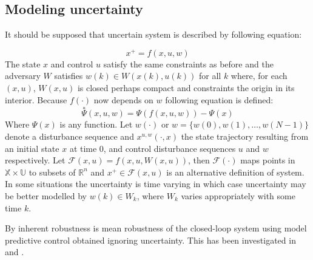 \subsection*{Modeling uncertainty}
\noindent It should be supposed that uncertain system is  described by following equation:

\begin{equation}
    x^+ = f(x,u,w)
\end{equation}
\noindent The state $x$ and control $u$ satisfy the same constraints as before and the adversary $W$ satisfies $w(k)\in W(x(k),u(k))$ for all $k$ where, for each $(x,u)$, $W(x,u)$ is closed perhaps compact and constraints the origin in its interior. Because $f(\cdot)$ now depends on $w$ following equation is defined:
\begin{equation}
    \overset{\ast}{\Psi}(x,u,w)=\Psi(f(x,u,w))-\Psi(x)
\end{equation}
\noindent Where $\Psi(x)$ is any function. Let $w(\cdot)$ or $w=\{w(0), w(1),\dots, w(N-1)\}$ denote a disturbance sequence and $x^{u,w}(\cdot,x)$ the state trajectory resulting from an initial state $x$ at time 0, and control disturbance sequences $u$ and $w$ respectively. Let $\mathscr{F}(x,u)=f(x,u,W(x,u))$, then $\mathscr{F}(\cdot)$ maps points in $\mathbb{X}\times\mathbb{U}$ to subsets of $\mathbb{R}^n$ and $x^+\in\mathscr{F}(x,u)$ is an alternative definition of system. In some situations the uncertainty is time varying in which case uncertainty may be better modelled by $w(k)\in W_k$, where $W_k$ varies appropriately with some time $k$.

By inherent robustness is mean robustness of the closed-loop system using model predictive control obtained ignoring uncertainty. This has been investigated in \cite{de1996robustness} and \cite{magni1997stability}.

